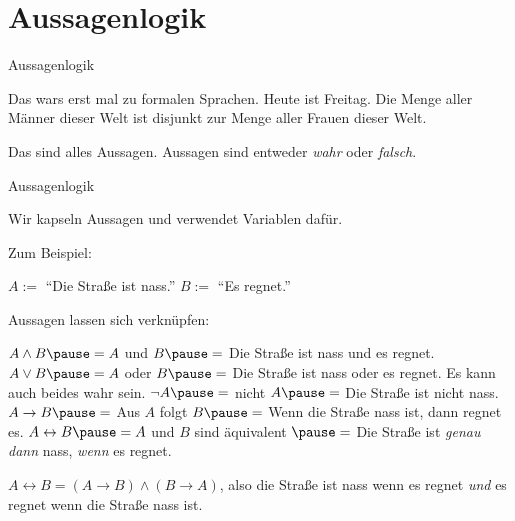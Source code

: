 \def\tutdate{11.11.2016}



\section{Aussagenlogik}

\begin{frame}{Aussagenlogik}
	\begin{itemize}
		\pitem Das wars erst mal zu formalen Sprachen.
		\pitem Heute ist Freitag.
		\pitem Die Menge aller Männer dieser Welt ist disjunkt zur Menge aller Frauen dieser Welt.
	\end{itemize}

	\pause
	
	Das sind alles Aussagen. \pause Aussagen sind entweder \emph{wahr} \pause oder \emph{falsch}.
\end{frame}

\begin{frame}{Aussagenlogik}
	\pause 
	
	Wir kapseln Aussagen und verwendet Variablen dafür. \pause 
	
	Zum Beispiel:
	
	\begin{itemize}
		\pitem $A := $ ``Die Straße ist nass.''
		\pitem $B := $ ``Es regnet.''
	\end{itemize}

	\pause Aussagen lassen sich verknüpfen:
	
	\begin{itemize}
		\pitem {} \pause $A \land B \pause = A$ und $B \pause = $ Die Straße ist nass und es regnet.
		\pitem {} \pause $A \lor B \pause = A$ oder $B \pause = $ Die Straße ist nass oder es regnet\pause . Es kann auch beides wahr sein.
		\pitem {} \pause $\lnot A \pause = $ nicht $A \pause = $ Die Straße ist nicht nass.
		\pitem {} \pause $A \rightarrow B \pause = $ Aus $A$ folgt $B \pause = $ Wenn die Straße nass ist, dann regnet es.
		\pitem {} \pause $A \leftrightarrow B \pause = A$ und $B$ sind äquivalent $\pause = $ Die Straße ist \emph{genau dann} nass, \emph{wenn} es regnet.
		\begin{itemize}
			\pitem $A \leftrightarrow B = (A \rightarrow B) \land (B \rightarrow A)$\pause , also die Straße ist nass wenn es regnet \emph{und} es regnet wenn die Straße nass ist.
		\end{itemize}
	\end{itemize}

\end{frame}

